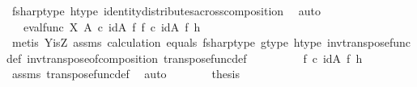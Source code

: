 \begin{isabellebody}
\ f{\isacharunderscore}{\kern0pt}sharp{\isacharunderscore}{\kern0pt}type\ h{\isacharunderscore}{\kern0pt}type\ identity{\isacharunderscore}{\kern0pt}distributes{\isacharunderscore}{\kern0pt}across{\isacharunderscore}{\kern0pt}composition\ \isamarkupfalse%
\ auto\isanewline
\ \ \ \ \isamarkupfalse%
\ \isamarkupfalse%
\ {\isachardoublequoteopen}{\isachardot}{\kern0pt}{\isachardot}{\kern0pt}{\isachardot}{\kern0pt}\ {\isacharequal}{\kern0pt}\ {\isacharparenleft}{\kern0pt}eval{\isacharunderscore}{\kern0pt}func\ X\ A\ {\isasymcirc}\isactrlsub c\ {\isacharparenleft}{\kern0pt}id{\isacharparenleft}{\kern0pt}A{\isacharparenright}{\kern0pt}\ {\isasymtimes}\isactrlsub f\ f\isactrlsup {\isasymsharp}{\isacharparenright}{\kern0pt}{\isacharparenright}{\kern0pt}\ {\isasymcirc}\isactrlsub c\ {\isacharparenleft}{\kern0pt}id{\isacharparenleft}{\kern0pt}A{\isacharparenright}{\kern0pt}\ {\isasymtimes}\isactrlsub f\ h{\isacharparenright}{\kern0pt}{\isachardoublequoteclose}\isanewline
\ \ \ \ \ \ \isamarkupfalse%
\ {\isacharparenleft}{\kern0pt}metis\ Y{\isacharunderscore}{\kern0pt}is{\isacharunderscore}{\kern0pt}Z\ assms{\isacharparenleft}{\kern0pt}{}{\isacharparenright}{\kern0pt}\ calculation\ equals\ f{\isacharunderscore}{\kern0pt}sharp{\isacharunderscore}{\kern0pt}type{}\ g{\isacharunderscore}{\kern0pt}type\ h{\isacharunderscore}{\kern0pt}type\ inv{\isacharunderscore}{\kern0pt}transpose{\isacharunderscore}{\kern0pt}func{\isacharunderscore}{\kern0pt}def{}\ inv{\isacharunderscore}{\kern0pt}transpose{\isacharunderscore}{\kern0pt}of{\isacharunderscore}{\kern0pt}composition\ transpose{\isacharunderscore}{\kern0pt}func{\isacharunderscore}{\kern0pt}def{\isacharparenright}{\kern0pt}\isanewline
\ \ \ \ \isamarkupfalse%
\ \isamarkupfalse%
\ {\isachardoublequoteopen}{\isachardot}{\kern0pt}{\isachardot}{\kern0pt}{\isachardot}{\kern0pt}\ {\isacharequal}{\kern0pt}\ f\ {\isasymcirc}\isactrlsub c\ {\isacharparenleft}{\kern0pt}id{\isacharparenleft}{\kern0pt}A{\isacharparenright}{\kern0pt}\ {\isasymtimes}\isactrlsub f\ h{\isacharparenright}{\kern0pt}{\isachardoublequoteclose}\isanewline
\ \ \ \ \ \ \isamarkupfalse%
\ assms{\isacharparenleft}{\kern0pt}{}{\isacharparenright}{\kern0pt}\ transpose{\isacharunderscore}{\kern0pt}func{\isacharunderscore}{\kern0pt}def\ \isamarkupfalse%
\ auto\isanewline
\ \ \ \ \isamarkupfalse%
\ \isamarkupfalse%
\ {\isacharquery}{\kern0pt}thesis\isanewline
\ \ \ \ \ \ \isamarkupfalse%

\end{isabellebody}
